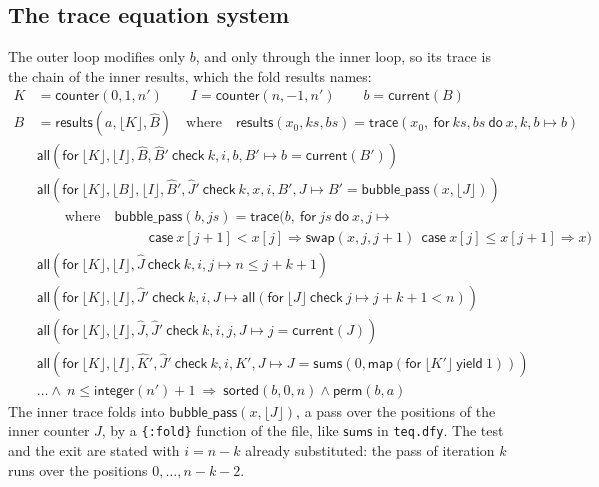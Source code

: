 \documentclass[11pt,a4paper]{article}
\newcommand{\bl}[1]{\lfloor #1\rfloor}                       %
\newcommand{\tr}[3]{\mathsf{trace}(#1,\ \mathsf{for}\ #2\ \mathsf{do}\ #3)}
\newcommand{\mapc}[2]{\mathsf{map}(\mathsf{for}\ #1\ \mathsf{yield}\ #2)}
\newcommand{\al}[2]{\mathsf{all}(\mathsf{for}\ #1\ \mathsf{check}\ #2)}
\newcommand{\cnt}{\mathsf{counter}}
\newcommand{\cur}{\mathsf{current}}
\newcommand{\intf}{\mathsf{integer}}
\newcommand{\sums}{\mathsf{sums}}
\newcommand{\sorted}{\mathsf{sorted}}
\newcommand{\perm}{\mathsf{perm}}
\newcommand{\swap}[3]{\mathsf{swap}(#1, #2, #3)}
\newcommand{\upd}[2]{\mathsf{case}\ #1 \Rightarrow #2}
\newcommand{\lemma}[1]{\textsf{#1}}
\newcommand{\seq}[1]{\hat{#1}}                               %
\begin{document}
\subsection{The trace equation system}
The outer loop modifies only $b$, and only through the inner loop, so its trace is the chain of the inner
results, which the fold \lemma{results} names:
\begin{align}
  K &= \cnt(0, 1, n') \qquad I = \cnt(n, -1, n') \qquad b = \cur(B) \label{eq:bs0}\\
  B &= \mathsf{results}(a, \bl{K}, \seq{B}) \quad\text{where}\quad \mathsf{results}(x_0, ks, bs) = \tr{x_0}{ks, bs}{x, k, b \mapsto b} \nonumber\\
  &\al{\bl{K}, \bl{I}, \seq{B}, \seq{B}'}{k, i, b, B' \mapsto b = \cur(B')} \label{eq:bs1}\\
  &\al{\bl{K}, \bl{B}, \bl{I}, \seq{B}', \seq{J}'}{k, x, i, B', J \mapsto B' = \mathsf{bubble\_pass}(x, \bl{J})} \label{eq:bs2}\\
  &\qquad\text{where}\quad \mathsf{bubble\_pass}(b, js) = \tr{b}{js}{x, j \mapsto {}\nonumber\\
  &\qquad\qquad\qquad\qquad \upd{x[j+1] < x[j]}{\swap{x}{j}{j + 1}}\ \ \upd{x[j] \le x[j+1]}{x}} \nonumber\\
  &\al{\bl{K}, \bl{I}, \seq{J}}{k, i, j \mapsto n \le j + k + 1} \label{eq:bs3}\\
  &\al{\bl{K}, \bl{I}, \seq{J}'}{k, i, J \mapsto \al{\bl{J}}{j \mapsto j + k + 1 < n}} \label{eq:bs4}\\
  &\al{\bl{K}, \bl{I}, \seq{J}, \seq{J}'}{k, i, j, J \mapsto j = \cur(J)} \label{eq:bs5}\\
  &\al{\bl{K}, \bl{I}, \seq{K}', \seq{J}'}{k, i, K', J \mapsto J = \sums(0, \mapc{\bl{K'}}{1})} \label{eq:bs6}\\
  &\ldots \wedge\ n \le \intf(n') + 1\ \Longrightarrow\ \sorted(b, 0, n) \wedge \perm(b, a) \nonumber
\end{align}
The inner trace folds into $\mathsf{bubble\_pass}(x, \bl{J})$, a pass over the positions of the inner
counter $J$, by a \texttt{\{:fold\}} function of the file, like $\sums$ in \texttt{teq.dfy}. The test and
the exit are stated with $i = n - k$ already substituted: the pass of iteration $k$ runs over the
positions $0, \ldots, n - k - 2$.
\end{document}
